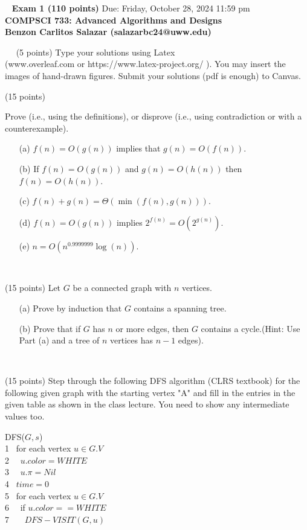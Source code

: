 \documentclass[12pt]{article}
\newcommand{\vs}{\vspace{2mm}}
\newcommand{\ls}{\vspace{5mm}}
\newcommand{\bc}{\begin{center}}
\newcommand{\ec}{\end{center}}
\newcommand{\ha}{\hspace{5mm}}
\begin{document}
\bc\ 
 { \bf Exam 1 (110 points)} Due: Friday, October 28, 2024 11:59 pm\\
 { \bf COMPSCI 733: Advanced Algorithms and Designs } \\ 
 { \bf Benzon Carlitos Salazar (salazarbc24@uww.edu) } 
\ec\
\ls\
 (5 points)
Type your solutions using Latex \\
(www.overleaf.com or https://www.latex-project.org/ ). You may insert the images of hand-drawn figures. Submit your solutions (pdf is enough)  to Canvas. 
\ls\

\noindent{\bf Problem 1: } (15 points)

Prove (i.e., using the definitions), or disprove (i.e., using contradiction or with a counterexample).

\begin{itemize}
    \item[(a)] $ f(n)= O(g(n))$ implies that $g(n) = O(f(n)).$
    \item[(b)] If $f(n) = O(g(n))$ and $g(n) = O(h(n))$ then $f(n) = O(h(n)).$
    \item[(c)] $f(n)+g(n) = \Theta(\min(f(n), g(n))).$
    \item[(d)] $f(n)= O(g(n))$ implies $2^{f(n)} = O(2^{g(n)}).$
    \item[(e)] $n  = O(n^{0.9999999} \log (n))$.
\end{itemize}

\vs\

(15 points)
Let $G$ be a connected graph with $n$ vertices.

\begin{itemize}
    \item[(a)] Prove by induction that $G$ contains a spanning tree.
    \item[(b)] Prove that if $G$ has $n$ or more edges, then $G$ contains a cycle.(Hint: Use Part (a) and a tree of $n$ vertices has $n-1$ edges). 
\end{itemize}

\vs\

(15 points)
Step through the following DFS algorithm (CLRS textbook) for the following given graph with the starting vertex "A" and fill in the entries in the given table as shown in the class lecture. You need to show any intermediate values too.

DFS($G,s$) \\
1 \ha\ for each vertex $u \in G.V $\\
2 \ha\ \ha\ $u.color = WHITE$ \\
3 \ha\ \ha\  $u.\pi = Nil$ \\
4 \ha\  $time=0$ \\
5 \ha\  for each vertex $u \in G.V $\\
6 \ha\ \ha\  if $ u.color == WHITE$ \\
7 \ha\ \ha\ \ha\ $DFS-VISIT(G,u)$ \\ \\
\end{document}
